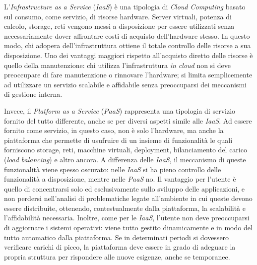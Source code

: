 L’\textit{Infrastructure as a Service} (\textit{IaaS}) è una tipologia di \textit{Cloud Computing} basato sul consumo, come servizio, di risorse hardware.
Server virtuali, potenza di calcolo, storage, reti vengono messi a disposizione per essere utilizzati senza necessariamente dover affrontare costi di acquisto dell'hardware stesso.
In questo modo, chi adopera dell'infrastruttura ottiene il totale controllo delle risorse a sua disposizione.
Uno dei vantaggi maggiori rispetto all'acquisto diretto delle risorse è quello della manutenzione:
chi utilizza l’infrastruttura \textit{in cloud} non si deve preoccupare di fare manutenzione o rinnovare l’hardware;
si limita semplicemente ad utilizzare un servizio scalabile e affidabile senza preoccuparsi dei meccanismi di gestione interna.

Invece, il \textit{Platform as a Service} (\textit{PaaS}) rappresenta una tipologia di servizio fornito del tutto differente, anche se per diversi aspetti simile alle \textit{IaaS}.
Ad essere fornito come servizio, in questo caso, non è solo l'hardware, ma anche la piattaforma che permette di usufruire di un insieme di funzionalità le quali forniscono storage, reti, macchine virtuali, deployment, bilanciamento del carico (\textit{load balancing}) e altro ancora.
A differenza delle \textit{IaaS}, il meccanismo di queste funzionalità viene spesso oscurato: nelle \textit{IaaS} si ha pieno controllo delle funzionalità a disposizione, mentre nelle \textit{PaaS} no.
Il vantaggio per l'utente è quello di concentrarsi solo ed esclusivamente sullo sviluppo delle applicazioni, e non perdersi nell'analisi di problematiche legate all'ambiente in cui queste devono essere distribuite, ottenendo, contestualmente dalla piattaforma, la scalabilità e  l'affidabilità necessaria.
Inoltre, come per le \textit{IaaS}, l'utente non deve preoccuparsi di aggiornare i sistemi operativi:
viene tutto gestito dinamicamente e in modo del tutto automatico dalla piattaforma.
Se in determinati periodi si dovessero verificare carichi di picco, la piattaforma deve essere in grado di adeguare la propria struttura per rispondere alle nuove esigenze, anche se temporanee.

